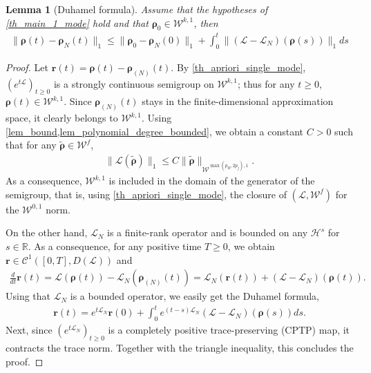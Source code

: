 \documentclass{article}
\newtheorem{lemma}{Lemma}
\newcommand{\xL}{\mathcal{L}}
\newcommand{\xH}{\mathcal{H}}
\newcommand{\xW}{\mathcal{W}}
\newcommand{\rN}{{\boldsymbol{\rho}_{(N)}}}
\let\bf\boldsymbol
\newcommand{\orho}{{\bf \rho}}
\newcommand{\opr}{{\bf r}}
\begin{document}
\begin{lemma}[Duhamel formula]
    \label{lem_Duhamel}
    Assume that the hypotheses of \cref{th_main_1_mode} hold and that $\orho_0 \in \xW^{k,1}$, then
    \begin{align}
        \label{eq:lem_Duhamel}
        \|\orho(t)-\orho_N(t)\|_1 \leq   \|\orho_0-\orho_N(0)\|_1 + \int_0^t \| (\xL-\xL_N)(\orho(s))\|_1 ds
    \end{align}
\end{lemma}
\begin{proof}
    Let $\opr(t)=\orho(t)-\rN(t)$. By \cref{th_apriori_single_mode}, $(e^{t\xL})_{t\geq 0}$ is a strongly continuous semigroup on $\xW^{k,1}$; thus for any $t\geq 0$, $\orho(t)\in \xW^{k,1}$. Since $\rN(t)$ stays in the finite-dimensional approximation space, it clearly belongs to $\xW^{k,1}$. Using \cref{lem_bound,lem_polynomial_degree_bounded}, we obtain a constant $C>0$ such that for any $\tilde \orho \in \xW^{f}$,
    \begin{align}
        \|\xL(\tilde \orho)\|_1 \leq C \|\tilde \orho\|_{\xW^{\max(p_H,2p_j),1}}.
    \end{align}
    As a consequence, $\xW^{k,1}$ is included in the domain of the generator of the semigroup, that is, using \cref{th_apriori_single_mode}, the closure of $(\xL,\xW^f)$ for the $\xW^{0,1}$ norm.

    On the other hand, $\xL_N$ is a finite-rank operator and is bounded on any $\xH^s$ for $s\in \mathbb{R}$. As a consequence, for any positive time $T \geq 0$, we obtain $\opr\in \mathcal{C}^1([0,T],D(\xL))$ and
    \begin{align}
        \frac{d}{dt}\opr(t)= \xL(\orho(t))-\xL_N(\rN(t))=\xL_N(\opr(t))+(\xL-\xL_N)(\orho(t)).
    \end{align}
    Using that $\xL_N$ is a bounded operator, we easily get the Duhamel formula,
    \begin{align}
        \opr(t)=e^{t\xL_N}\opr(0)+\int_0^t e^{(t-s)\xL_N}(\xL-\xL_N)(\orho(s))ds.
    \end{align}
    Next, since $(e^{t\xL_N})_{t\geq 0}$ is a completely positive trace-preserving (CPTP) map, it contracts the trace norm. Together with the triangle inequality, this concludes the proof.
\end{proof}
\end{document}
